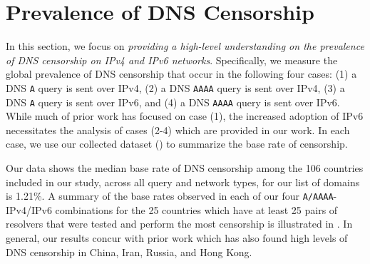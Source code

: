 \section{Prevalence of DNS Censorship}
\label{sec:prevalence}

 In this section, we focus on \emph{providing a high-level
understanding on the prevalence of DNS censorship on IPv4 and IPv6 networks}.
Specifically, we measure the global prevalence of DNS censorship that occur in
the following four cases: 
%
(1) a DNS {\tt A} query is sent over IPv4, 
(2) a DNS {\tt AAAA} query is sent over IPv4, 
(3) a DNS {\tt A} query is sent over IPv6, and 
(4) a DNS {\tt AAAA} query is sent over IPv6.
%
While much of prior work has focused on case (1), the increased adoption of
IPv6 necessitates the analysis of cases (2-4) which are provided in our work.
%
In each case, we use our collected dataset (\cf {}) to
summarize the base rate of censorship.



Our data shows the median base rate of DNS censorship among the 106 countries
included in our study, across all query and network types, for our list of
domains is 1.21\%. 
%
A summary of the base rates observed in each of our four {\tt A/AAAA}-IPv4/IPv6
combinations for the 25 countries which have at least 25 pairs of resolvers that
were tested and perform the most censorship is illustrated in
. 
%
In general, our results concur with prior work which has also found high levels
of DNS censorship in China, Iran, Russia, and Hong Kong.

